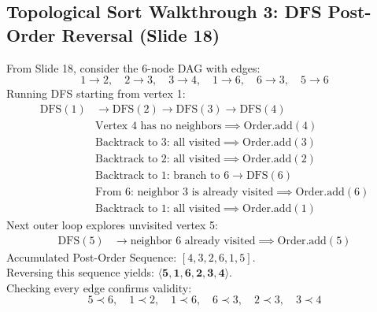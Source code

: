 \documentclass[10pt,journal,compsoc,onecolumn]{IEEEtran}
\begin{document}
\subsection{Topological Sort Walkthrough 3: DFS Post-Order Reversal (Slide 18)}
From Slide 18, consider the 6-node DAG with edges:
\begin{equation*}
1 \to 2, \quad 2 \to 3, \quad 3 \to 4, \quad 1 \to 6, \quad 6 \to 3, \quad 5 \to 6
\end{equation*}
Running DFS starting from vertex 1:
\begin{align*}
\text{DFS}(1) &\to \text{DFS}(2) \to \text{DFS}(3) \to \text{DFS}(4) \\
&\text{Vertex 4 has no neighbors} \implies \text{Order.add}(4) \\
&\text{Backtrack to 3: all visited} \implies \text{Order.add}(3) \\
&\text{Backtrack to 2: all visited} \implies \text{Order.add}(2) \\
&\text{Backtrack to 1: branch to 6} \to \text{DFS}(6) \\
&\text{From 6: neighbor 3 is already visited} \implies \text{Order.add}(6) \\
&\text{Backtrack to 1: all visited} \implies \text{Order.add}(1)
\end{align*}
Next outer loop explores unvisited vertex 5:
\begin{align*}
\text{DFS}(5) &\to \text{neighbor 6 already visited} \implies \text{Order.add}(5)
\end{align*}
Accumulated Post-Order Sequence: $[4, 3, 2, 6, 1, 5]$. \\
Reversing this sequence yields: $\mathbf{\langle 5, 1, 6, 2, 3, 4 \rangle}$. \\
Checking every edge confirms validity:
\begin{equation*}
5 \prec 6, \quad 1 \prec 2, \quad 1 \prec 6, \quad 6 \prec 3, \quad 2 \prec 3, \quad 3 \prec 4
\end{equation*}
\end{document}
